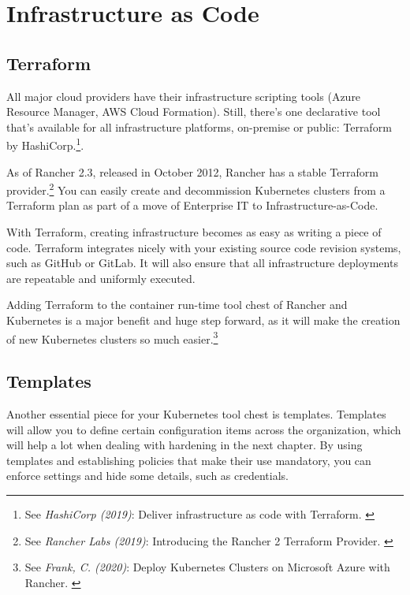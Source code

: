 %
%

\pagebreak
\section{Infrastructure as Code}

\onehalfspacing

\subsection{Terraform}

All major cloud providers have their infrastructure scripting tools (Azure Resource Manager, AWS Cloud Formation). Still, there's one declarative tool that's available for all infrastructure platforms, on-premise or public: Terraform by HashiCorp.\footnote{See \textit{HashiCorp (2019)}: Deliver infrastructure as code with Terraform. \cite{terraform}}.

As of Rancher 2.3, released in October 2012, Rancher has a stable Terraform provider.\footnote{See \textit{Rancher Labs (2019)}: Introducing the Rancher 2 Terraform Provider. \cite{terraformProvider}} You can easily create and decommission Kubernetes clusters from a Terraform plan as part of a move of Enterprise IT to Infrastructure-as-Code.

With Terraform, creating infrastructure becomes as easy as writing a piece of code. Terraform integrates nicely with your existing source code revision systems, such as GitHub or GitLab. It will also ensure that all infrastructure deployments are repeatable and uniformly executed.

Adding Terraform to the container run-time tool chest of Rancher and Kubernetes is a major benefit and huge step forward, as it will make the creation of new Kubernetes clusters so much easier.\footnote{See \textit{Frank, C. (2020)}: Deploy Kubernetes Clusters on Microsoft Azure with Rancher. \cite{deployAzure}}

\subsection{Templates}

Another essential piece for your Kubernetes tool chest is templates. Templates will allow you to define certain configuration items across the organization, which will help a lot when dealing with hardening in the next chapter. By using templates and establishing policies that make their use mandatory, you can enforce settings and hide some details, such as credentials.

